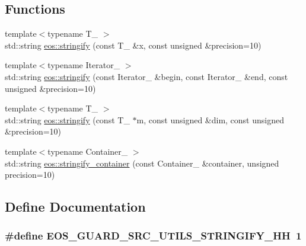 \subsection*{Functions}
\begin{DoxyCompactItemize}
\item 
{\footnotesize template$<$typename T\_\- $>$ }\\std::string \hyperlink{namespaceeos_a4d4fd832aebc28739c76d8cbd3dda6df}{eos::stringify} (const T\_\- \&x, const unsigned \&precision=10)
\item 
{\footnotesize template$<$typename Iterator\_\- $>$ }\\std::string \hyperlink{namespaceeos_ab40b1d4ac1085fb65c4ca86d05079c5c}{eos::stringify} (const Iterator\_\- \&begin, const Iterator\_\- \&end, const unsigned \&precision=10)
\item 
{\footnotesize template$<$typename T\_\- $>$ }\\std::string \hyperlink{namespaceeos_a03d43be369d3c0247d25fedbb6eeb8e9}{eos::stringify} (const T\_\- $\ast$m, const unsigned \&dim, const unsigned \&precision=10)
\item 
{\footnotesize template$<$typename Container\_\- $>$ }\\std::string \hyperlink{namespaceeos_ae90d5cf81cb527f4088dd11daf1e456d}{eos::stringify\_\-container} (const Container\_\- \&container, unsigned precision=10)
\end{DoxyCompactItemize}


\subsection{Define Documentation}
\hypertarget{stringify_8hh_ac8afa13bdbf752fd2e2634f1009f187d}{
\subsubsection[{EOS\_\-GUARD\_\-SRC\_\-UTILS\_\-STRINGIFY\_\-HH}]{\setlength{\rightskip}{0pt plus 5cm}\#define EOS\_\-GUARD\_\-SRC\_\-UTILS\_\-STRINGIFY\_\-HH~1}}
\label{stringify_8hh_ac8afa13bdbf752fd2e2634f1009f187d}
